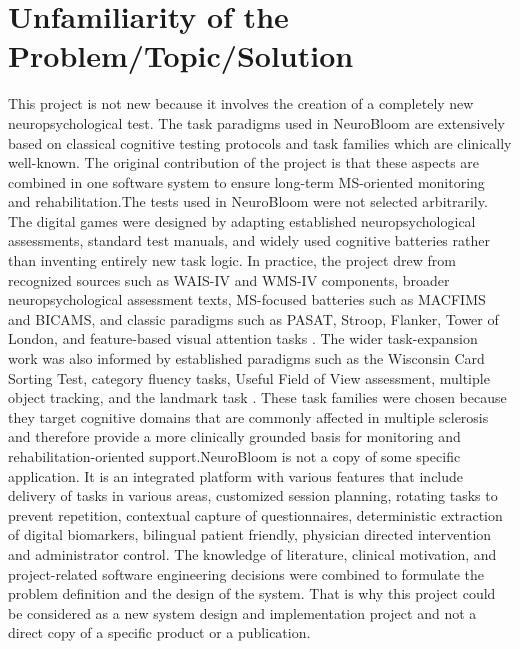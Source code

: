 \documentclass[12pt,a4paper]{report}
\begin{document}
\section{Unfamiliarity of the Problem/Topic/Solution}
This project is not new because it involves the creation of a completely new neuropsychological test. The task paradigms used in NeuroBloom are extensively based on classical cognitive testing protocols and task families which are clinically well-known. The original contribution of the project is that these aspects are combined in one software system to ensure long-term MS-oriented monitoring and rehabilitation.The tests used in NeuroBloom were not selected arbitrarily. The digital games were designed by adapting established neuropsychological assessments, standard test manuals, and widely used cognitive batteries rather than inventing entirely new task logic. In practice, the project drew from recognized sources such as WAIS-IV and WMS-IV components, broader neuropsychological assessment texts, MS-focused batteries such as MACFIMS and BICAMS, and classic paradigms such as PASAT, Stroop, Flanker, Tower of London, and feature-based visual attention tasks \cite{wechsler2008,wechsler2009,lezak2012,strauss2006,benedict2002,benedict2012,gronwall1977,stroop1935,eriksen1974,shallice1982,treisman1980}. The wider task-expansion work was also informed by established paradigms such as the Wisconsin Card Sorting Test, category fluency tasks, Useful Field of View assessment, multiple object tracking, and the landmark task \cite{berg1948,henry2004,ball1993,pylyshyn1988,harvey1995}. These task families were chosen because they target cognitive domains that are commonly affected in multiple sclerosis and therefore provide a more clinically grounded basis for monitoring and rehabilitation-oriented support.NeuroBloom is not a copy of some specific application. It is an integrated platform with various features that include delivery of tasks in various areas, customized session planning, rotating tasks to prevent repetition, contextual capture of questionnaires, deterministic extraction of digital biomarkers, bilingual patient friendly, physician directed intervention and administrator control. The knowledge of literature, clinical motivation, and project-related software engineering decisions were combined to formulate the problem definition and the design of the system. That is why this project could be considered as a new system design and implementation project and not a direct copy of a specific product or a publication.
\end{document}

